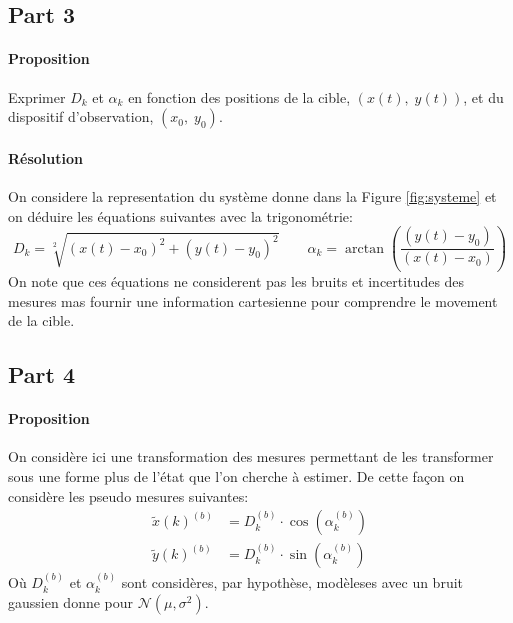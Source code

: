 \documentclass{article}
\begin{document}
\subsection{Part 3}
\paragraph{Proposition}Exprimer $D_k$ et $\alpha_k$ en fonction des positions de la cible, $(x(t),\; y(t))$, et du dispositif d'observation, $(x_0,\; y_0)$.

\paragraph{Résolution}On considere la representation du système donne dans la Figure \ref{fig:systeme} et on déduire les équations suivantes avec la trigonométrie:
\begin{equation}
    \boxed{D_{k} = \sqrt[2]{(x(t) - x_{0})^2 + (y(t) - y_{0})^2}}
    \qquad
    \boxed{\alpha_{k} = \arctan\left( \frac{(y(t) - y_{0})}{(x(t) - x_{0})} \right)}
\end{equation}
On note que ces équations ne considerent pas les bruits et incertitudes des mesures mas fournir une information cartesienne pour comprendre le movement de la cible.

\subsection{Part 4}
\paragraph{Proposition}On considère ici une transformation des mesures permettant de les transformer sous une forme plus de l'état que l'on cherche à estimer. De cette façon on considère les pseudo mesures suivantes:
\begin{align*}
    \tilde{x}(k)^{(b)} &= D_{k}^{(b)} \cdot \cos(\alpha_{k}^{(b)})\\
    \tilde{y}(k)^{(b)} &= D_{k}^{(b)} \cdot \sin(\alpha_{k}^{(b)})
\end{align*}
Où $D_{k}^{(b)}$ et $\alpha_{k}^{(b)}$ sont considères, par hypothèse, modèleses avec un bruit gaussien donne pour $\mathcal{N}(\mu, \sigma^2)$.
\end{document}
